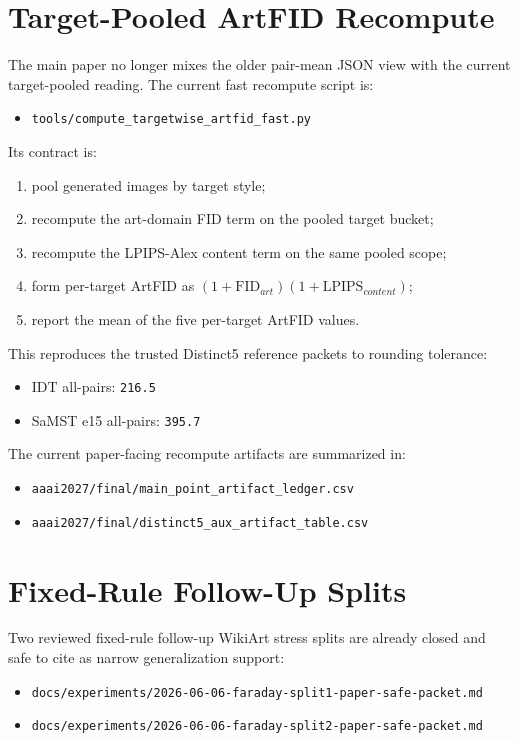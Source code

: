 \documentclass[letterpaper]{article}
\begin{document}
\section{Target-Pooled ArtFID Recompute}
The main paper no longer mixes the older pair-mean JSON view with the current target-pooled reading. The current fast recompute script is:
\begin{itemize}
\item \texttt{tools/compute\_targetwise\_artfid\_fast.py}
\end{itemize}
Its contract is:
\begin{enumerate}
\item pool generated images by target style;
\item recompute the art-domain FID term on the pooled target bucket;
\item recompute the LPIPS-Alex content term on the same pooled scope;
\item form per-target ArtFID as $(1+\mathrm{FID}_{art})(1+\mathrm{LPIPS}_{content})$;
\item report the mean of the five per-target ArtFID values.
\end{enumerate}

This reproduces the trusted Distinct5 reference packets to rounding tolerance:
\begin{itemize}
\item IDT all-pairs: \texttt{216.5}
\item SaMST e15 all-pairs: \texttt{395.7}
\end{itemize}

The current paper-facing recompute artifacts are summarized in:
\begin{itemize}
\item \texttt{aaai2027/final/main\_point\_artifact\_ledger.csv}
\item \texttt{aaai2027/final/distinct5\_aux\_artifact\_table.csv}
\end{itemize}

\section{Fixed-Rule Follow-Up Splits}
Two reviewed fixed-rule follow-up WikiArt stress splits are already closed and safe to cite as narrow generalization support:
\begin{itemize}
\item \texttt{docs/experiments/2026-06-06-faraday-split1-paper-safe-packet.md}
\item \texttt{docs/experiments/2026-06-06-faraday-split2-paper-safe-packet.md}
\end{itemize}
\end{document}
